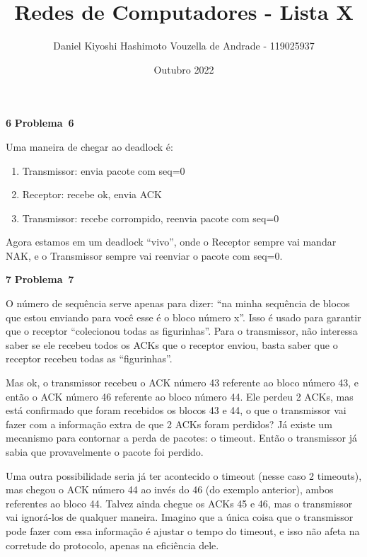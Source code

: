 \documentclass{article}
\title{Redes de Computadores - Lista X}
\author{Daniel Kiyoshi Hashimoto Vouzella de Andrade - 119025937}
\date{Outubro 2022}
\newcommand{\blank}{\rule[0pt]{5em}{.3pt}}
\newcommand{\preamble}[2]{\noindent%
    Fiz esse trabalho com a ajuda de {\bfseries #1}
    e consultei {\bfseries #2}.
    A versão final do trabalho foi feita
    por mim de forma independente.
    Respostas sem no mínimo 3 frases de justificativa
    não contam ponto.
    \par\noindent Assinatura: \blank\blank\bigskip}
\newcounter{exe-list}
\newenvironment{exe}[2][Problema]
    {\newcommand{\opt}{(Opcional)}%
    \newcommand{\sketch}[1]{{\bfseries Rascunho:} ##1}%
    \medskip\par\noindent\ifthenelse{\equal{#1}{}}
        {\textbf{\large #2}}
        {\textbf{\large #1~#2}}%
    \medskip\par\noindent}
    {\medskip}
\begin{document}
\maketitle


\begin{exe}{6}
    Uma maneira de chegar ao deadlock é:
    \begin{enumerate}
        \item Transmissor: envia pacote com seq=0
        \item Receptor: recebe ok, envia ACK
        \item Transmissor: recebe corrompido,
            reenvia pacote com seq=0
    \end{enumerate}
    Agora estamos em um deadlock ``vivo'',
    onde o Receptor sempre vai mandar NAK,
    e o Transmissor sempre vai reenviar o pacote com seq=0.
\end{exe}

\begin{exe}{7}
    O número de sequência serve apenas para dizer:
    ``na minha sequência de blocos que
    estou enviando para você
    esse é o bloco número x''.
    Isso é usado para garantir que o
    receptor ``colecionou todas as figurinhas''.
    Para o transmissor, não interessa saber
    se ele recebeu todos os ACKs que o receptor enviou,
    basta saber que o receptor recebeu todas as ``figurinhas''.

    Mas ok, o transmissor recebeu
    o ACK número 43 referente ao bloco número 43,
    e então
    o ACK número 46 referente ao bloco número 44.
    Ele perdeu 2 ACKs, mas está confirmado que
    foram recebidos os blocos 43 e 44,
    o que o transmissor vai fazer com a informação extra
    de que 2 ACKs foram perdidos?
    Já existe um mecanismo para contornar a perda de pacotes:
    o timeout.
    Então o transmissor já sabia que provavelmente
    o pacote foi perdido.

    Uma outra possibilidade seria já ter acontecido o timeout
    (nesse caso 2 timeouts),
    mas chegou o ACK número 44 ao invés do 46 (do exemplo anterior),
    ambos referentes ao bloco 44.
    Talvez ainda chegue os ACKs 45 e 46,
    mas o transmissor vai ignorá-los de qualquer maneira.
    Imagino que a única coisa que o transmissor pode fazer
    com essa informação é ajustar o tempo do timeout,
    e isso não afeta na corretude do protocolo,
    apenas na eficiência dele.
\end{exe}
\end{document}
